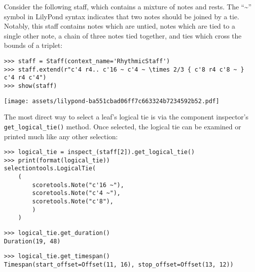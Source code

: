 Consider the following staff, which contains a mixture of notes and rests. The
\enquote{\textasciitilde{}} symbol in LilyPond syntax indicates that two notes
should be joined by a tie. Notably, this staff contains notes which are untied,
notes which are tied to a single other note, a chain of three notes tied
together, and ties which cross the bounds of a triplet:

\begin{comment}
<abjad>
staff = Staff(context_name='RhythmicStaff')
staff.extend(r"c'4 r4.. c'16 ~ c'4 ~ \times 2/3 { c'8 r4 c'8 ~ } c'4 r4 c'4")
show(staff)
</abjad>
\end{comment}

\begin{abjadbookoutput}
\begin{singlespacing}
\vspace{-0.5\baselineskip}
\begin{verbatim}
>>> staff = Staff(context_name='RhythmicStaff')
>>> staff.extend(r"c'4 r4.. c'16 ~ c'4 ~ \times 2/3 { c'8 r4 c'8 ~ } c'4 r4 c'4")
>>> show(staff)
\end{verbatim}
\noindent\texttt{[image: assets/lilypond-ba551cbad06ff7c663324b7234592b52.pdf]}
\end{singlespacing}
\end{abjadbookoutput}

\noindent The most direct way to select a leaf's logical tie is via the
component inspector's \texttt{get\_logical\_tie()} method. Once selected, the
logical tie can be examined or printed much like any other selection:

\begin{comment}
<abjad>
logical_tie = inspect_(staff[2]).get_logical_tie()
print(format(logical_tie))
logical_tie.get_duration()
logical_tie.get_timespan()
</abjad>
\end{comment}

\begin{abjadbookoutput}
\begin{singlespacing}
\vspace{-0.5\baselineskip}
\begin{verbatim}
>>> logical_tie = inspect_(staff[2]).get_logical_tie()
>>> print(format(logical_tie))
selectiontools.LogicalTie(
    (
        scoretools.Note("c'16 ~"),
        scoretools.Note("c'4 ~"),
        scoretools.Note("c'8"),
        )
    )
\end{verbatim}
\begin{verbatim}
>>> logical_tie.get_duration()
Duration(19, 48)
\end{verbatim}
\begin{verbatim}
>>> logical_tie.get_timespan()
Timespan(start_offset=Offset(11, 16), stop_offset=Offset(13, 12))
\end{verbatim}
\end{singlespacing}
\end{abjadbookoutput}

